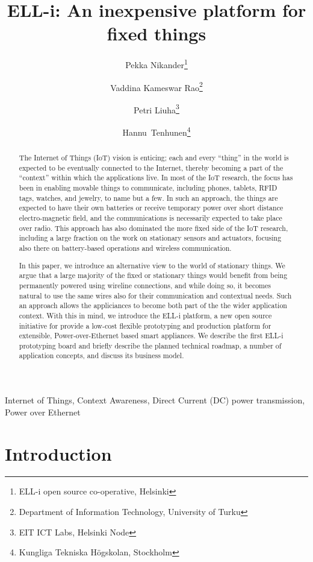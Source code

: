 \documentclass[final]{siamltex}
\title{{ELL-i}: An inexpensive platform for fixed things}
\author{Pekka Nikander\thanks{{ELL-i} open source co-operative, Helsinki}
  \and Vaddina Kameswar Rao\thanks{Department of Information Technology, University of Turku}
  \and Petri Liuha\thanks{EIT ICT Labs, Helsinki Node}
  \and \hbox{Hannu Tenhunen}\thanks{Kungliga Tekniska H\"{o}gskolan, Stockholm}}
\begin{document}
\maketitle

\begin{abstract}
The Internet of Things (IoT) vision is enticing; each and every
``thing'' in the world is expected to be eventually connected to the
Internet, thereby becoming a part of the ``context'' within which the
applications live.  
In most of the IoT research, the focus has been in enabling
movable things to communicate, including phones, tablets, RFID tags,
watches, and jewelry, to name but a few.  In such an approach, the
things are expected to have their own batteries or receive temporary
power over short distance electro-magnetic field, and the
communications is necessarily expected to take place over radio.
This approach has also dominated the more fixed side of the
IoT research, including a large fraction on the work on stationary
sensors and actuators, focusing also there on battery-based operations
and wireless communication. 

In this paper, we introduce an alternative view to the world
of stationary things.  We argue that a large majority of the fixed or
stationary things would benefit from being permanently powered using
wireline connections, and while doing so, it becomes natural to use
the same wires also for their communication and contextual needs.
Such an approach allows the appliciances to become both part of the
the wider application context.  With this in mind,
we introduce the
ELL-i platform, a new open source initiative for provide a low-cost
flexible prototyping and production platform for extensible,
Power-over-Ethernet based smart appliances.  We describe the first
ELL-i prototyping board and briefly describe the planned technical
roadmap, a number of application concepts, and discuss its
business model. 
\end{abstract}

\begin{keywords} 
Internet of Things, Context Awareness, Direct Current (DC) power
transmission, Power over Ethernet
\end{keywords}

\pagestyle{myheadings}
\thispagestyle{plain}


\section{Introduction}
\end{document}
